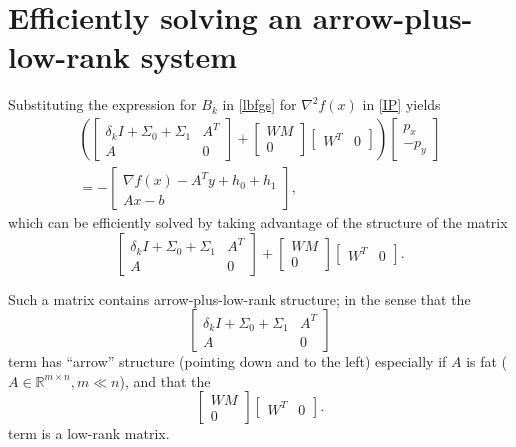 \documentclass{article}
\begin{document}
\section{Efficiently solving an arrow-plus-low-rank system}
Substituting the expression for $B_k$ in \eqref{lbfgs} for
    $\nabla^2 f(x)$ in \eqref{IP} yields
    \begin{multline}
    \left(
    \begin{bmatrix}
        \delta_k I + \Sigma_0 + \Sigma_1 & A^T \\
        A & 0 
    \end{bmatrix}
    +
    \begin{bmatrix} WM \\ 0 \end{bmatrix}
    \begin{bmatrix} W^T & 0 \end{bmatrix}
    \right)
    \begin{bmatrix} p_x \\ -p_y \end{bmatrix}
        \\ = -
    \begin{bmatrix}
        \nabla f(x) - A^T y + h_0 + h_1 \\ A x - b
    \end{bmatrix},\label{lipbfgs}
    \end{multline}
    which can be efficiently solved by taking advantage of the structure of 
    the matrix
    \begin{equation}
    \begin{bmatrix}
        \delta_k I + \Sigma_0 + \Sigma_1 & A^T \\
        A & 0 
    \end{bmatrix}
    +
    \begin{bmatrix} WM \\ 0 \end{bmatrix}
    \begin{bmatrix} W^T & 0 \end{bmatrix}. \label{aplr}
    \end{equation}

Such a matrix contains arrow-plus-low-rank structure;
    in the sense that the 
    \begin{equation}
    \begin{bmatrix}
        \delta_k I + \Sigma_0 + \Sigma_1 & A^T \\
        A & 0 
    \end{bmatrix} \label{arrow}
    \end{equation}
    term has ``arrow'' structure (pointing down and to the left)
    especially if $A$ is fat ($A \in \mathbb{R}^{m \times n}, m \ll n$), 
    and that the 
    \begin{equation}
    \begin{bmatrix} WM \\ 0 \end{bmatrix}
    \begin{bmatrix} W^T & 0 \end{bmatrix}.
    \end{equation}
    term is a low-rank matrix.
\end{document}
